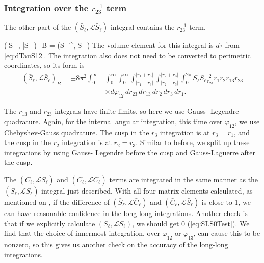 \documentclass[Dissertation.tex]{subfiles}
\begin{document}
\subsubsection{Integration over the \texorpdfstring{$r_{23}^{-1}$} {1/r23} term}
\label{sec:LongLongR23}
The other part of the $(\bar{S}_\ell,\mathcal{L} \bar{S}_\ell)$ integral
contains the $r_{23}^{-1}$ term.

\beq
(\bar{S}_\ell, \bar{S}_\ell)_B = \pm \left(S_\ell^\prime,  S_\ell\right)
\eeq
The volume element for this integral is $d\tau$ from \cref{eq:dTauS12}.
The integration also does not need to be converted to perimetric coordinates,
so its form is
\begin{align}
(\bar{S}_\ell,\mathcal{L} \bar{S}_\ell)_B = \pm 8\pi^2 \int_0^\infty & \int_0^\infty \int_0^\infty \int_{|r_1 - r_3|}^{|r_1 + r_3|} \int_{|r_2 - r_3|}^{|r_2 + r_3|} \int_0^{2\pi}  S_\ell^\prime S_\ell \frac{2}{r_{23}} r_1 r_2 r_{13} r_{23} \nonumber \\
& \times d\varphi_{12}\, dr_{23}\, dr_{13}\, dr_2\, dr_3\, dr_1.
\end{align}

The $r_{13}$ and $r_{23}$ integrals have finite limits, so here we use Gauss-
Legendre quadrature. Again, for the internal angular integration, this time 
over $\varphi_{12}$, we use Chebyshev-Gauss quadrature. The cusp in the $r_3$ 
integration is at $r_3 = r_1$, and the cusp in the $r_2$ integration is at
$r_2 = r_3$. Similar to before, we split up these integrations by using Gauss-
Legendre before the cusp and Gauss-Laguerre after the cusp.

The $(\bar{C}_\ell,\mathcal{L} \bar{S}_\ell)$ and
$(\bar{C}_\ell,\mathcal{L} \bar{C}_\ell)$ terms
are integrated in the same manner as the
$(\bar{S}_\ell,\mathcal{L} \bar{S}_\ell)$ integral just described. With all
four matrix elements calculated, as mentioned on \pageref{GenSLCandCLS}, if
the difference of $(\bar{S}_\ell,\mathcal{L} \bar{C}_\ell)$ and
$(\bar{C}_\ell,\mathcal{L} \bar{S}_\ell)$ is close to 1, we can have reasonable
confidence in the long-long integrations. Another check is that if we
explicitly calculate $(S_\ell,\mathcal{L} S_\ell)$, we should get 0
(\cref{eq:SLS0Test}). We find that the choice of innermost integration,
over $\varphi_{12}$ or $\varphi_{13}$, can cause this to be nonzero, so this
gives us another check on the accuracy of the long-long integrations.
\end{document}
